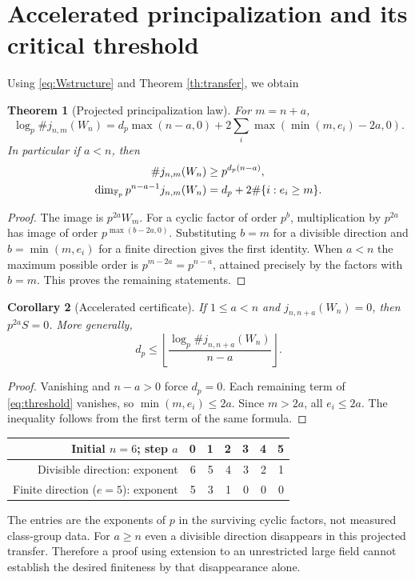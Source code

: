 \documentclass[11pt,a4paper]{article}
\newtheorem{theorem}{Theorem}[section]
\newtheorem{corollary}[theorem]{Corollary}
\theoremstyle{definition}\newtheorem{definition}[theorem]{Definition}
\theoremstyle{remark}\newtheorem{remark}[theorem]{Remark}
\numberwithin{equation}{section}
\begin{document}
\section{Accelerated principalization and its critical threshold}
Using \eqref{eq:Wstructure} and Theorem \ref{th:transfer}, we obtain
\begin{theorem}[Projected principalization law]\label{th:threshold}
For $m=n+a$,
\begin{equation}\label{eq:threshold}
\log_p\#j_{n,m}(W_n)=d_p\max(n-a,0)+
2\sum_i\max(\min(m,e_i)-2a,0).
\end{equation}
In particular if $a<n$, then
\begin{align}
\#j_{n,m}(W_n)&\ge p^{d_p(n-a)},\\
\dim_{\mathbb F_p}p^{n-a-1}j_{n,m}(W_n)&=d_p+2\#\{i:e_i\ge m\}.
\end{align}
\end{theorem}
\begin{proof}
The image is $p^{2a}W_m$. For a cyclic factor of order $p^b$, multiplication by $p^{2a}$ has image of order $p^{\max(b-2a,0)}$. Substituting $b=m$ for a divisible direction and $b=\min(m,e_i)$ for a finite direction gives the first identity. When $a<n$ the maximum possible order is $p^{m-2a}=p^{n-a}$, attained precisely by the factors with $b=m$. This proves the remaining statements.\end{proof}
\begin{corollary}[Accelerated certificate]\label{cor:accel}
If $1\le a<n$ and $j_{n,n+a}(W_n)=0$, then $p^{2a}S=0$. More generally,
\[
d_p\le \left\lfloor\frac{\log_p\#j_{n,n+a}(W_n)}{n-a}\right\rfloor.
\]
\end{corollary}
\begin{proof}
Vanishing and $n-a>0$ force $d_p=0$. Each remaining term of \eqref{eq:threshold} vanishes, so $\min(m,e_i)\le2a$. Since $m>2a$, all $e_i\le2a$. The inequality follows from the first term of the same formula.\end{proof}

\begin{center}
\small
\begin{tabular}{@{}rrrrrrr@{}}
\toprule
Initial $n=6$; step $a$&0&1&2&3&4&5\\\midrule
Divisible direction: exponent &6&5&4&3&2&1\\
Finite direction ($e=5$): exponent&5&3&1&0&0&0\\
\bottomrule
\end{tabular}
\end{center}
The entries are the exponents of $p$ in the surviving cyclic factors, not measured class-group data. For $a\ge n$ even a divisible direction disappears in this projected transfer. Therefore a proof using extension to an unrestricted large field cannot establish the desired finiteness by that disappearance alone.
\end{document}
